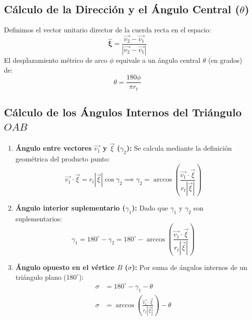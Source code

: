 \documentclass[12pt,a4paper]{article}
\begin{document}
\subsection{Cálculo de la Dirección y el Ángulo Central ($\theta$)}
Definimos el vector unitario director de la cuerda recta en el espacio:
\begin{equation}
    \mathbf{\hat{\xi}} = \frac{\vec{v_2} - \vec{v_1}}{|\vec{v_2} - \vec{v_1}|}
\end{equation}
El desplazamiento métrico de arco $\phi$ equivale a un ángulo central $\theta$ (en grados) de:
\begin{equation}
    \theta = \frac{180 \phi}{\pi r_t}
\end{equation}

\subsection{Cálculo de los Ángulos Internos del Triángulo $OAB$}
\begin{enumerate}
    \item \textbf{Ángulo entre vectores $\vec{v_1}$ y $\vec{\xi}$ ($\gamma_2$):} Se calcula mediante la definición geométrica del producto punto:
    \begin{equation}
        \vec{v_1} \cdot \vec{\xi} = r_t |\vec{\xi}| \cos \gamma_2 \implies \gamma_2 = \arccos \left( \frac{\vec{v_1} \cdot \vec{\xi}}{r_t |\vec{\xi}|} \right)
    \end{equation}
    \item \textbf{Ángulo interior suplementario ($\gamma_1$):} Dado que $\gamma_1$ y $\gamma_2$ son suplementarios:
    \begin{equation}
        \gamma_1 = 180^\circ - \gamma_2 = 180^\circ - \arccos \left( \frac{\vec{v_1} \cdot \vec{\xi}}{r_t |\vec{\xi}|} \right)
    \end{equation}
    \item \textbf{Ángulo opuesto en el vértice $B$ ($\sigma$):} Por suma de ángulos internos de un triángulo plano ($180^\circ$):
    \begin{align}
        \sigma &= 180^\circ - \gamma_1 - \theta \nonumber \\
        \sigma &= \arccos \left( \frac{\vec{v_1} \cdot \vec{\xi}}{r_t |\vec{\xi}|} \right) - \theta
    \end{align}
\end{enumerate}
\end{document}
